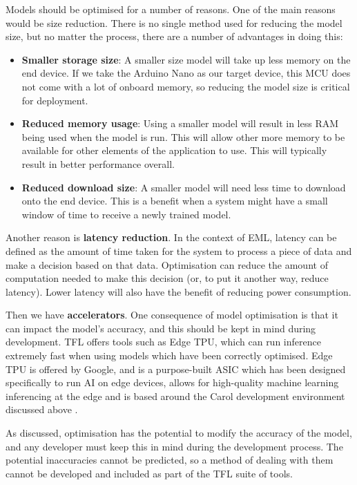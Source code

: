 \documentclass[conference]{IEEEtran}
\begin{document}
Models should be optimised for a number of reasons. One of the main reasons would be size reduction. There is no single method used for reducing the model size, but no matter the process, there are a number of advantages in doing this:

\begin{itemize}
    \item \textbf{Smaller storage size}: A smaller size model will take up less memory on the end device. If we take the Arduino Nano as our target device, this MCU does not come with a lot of onboard memory, so reducing the model size is critical for deployment.
    \item \textbf{Reduced memory usage}: Using a smaller model will result in less RAM being used when the model is run. This will allow other more memory to be available for other elements of the application to use. This will typically result in better performance overall.
    \item \textbf{Reduced download size}: A smaller model will need less time to download onto the end device. This is a benefit when a system might have a small window of time to receive a newly trained model.
\end{itemize}

Another reason is \textbf{latency reduction}. In the context of EML, latency can be defined as the amount of time taken for the system to process a piece of data and make a decision based on that data. Optimisation can reduce the amount of computation needed to make this decision (or, to put it another way, reduce latency). Lower latency will also have the benefit of reducing power consumption.

Then we have \textbf{accelerators}. One consequence of model optimisation is that it can impact the model's accuracy, and this should be kept in mind during development. TFL offers tools such as Edge TPU, which can run inference extremely fast when using models which have been correctly optimised. Edge TPU is offered by Google, and is a purpose-built ASIC which has been designed specifically to run AI on edge devices, allows for high-quality machine learning inferencing at the edge and is based around the Carol development environment discussed above \cite{google2}.

As discussed, optimisation has the potential to modify the accuracy of the model, and any developer must keep this in mind during the development process. The potential inaccuracies cannot be predicted, so a method of dealing with them cannot be developed and included as part of the TFL suite of tools.
\end{document}
